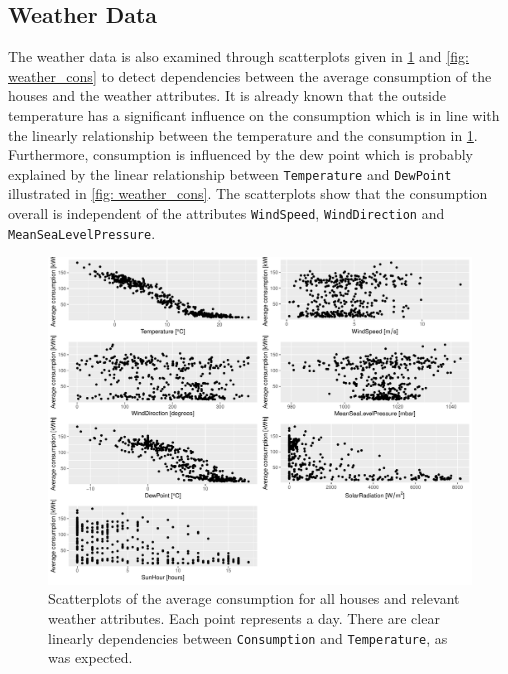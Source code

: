 \subsection{Weather Data}
The weather data is also examined through scatterplots given in \cref{fig: weatherpairs} and \cref{fig: weather_cons} to detect dependencies between the average consumption of the houses and the weather attributes. It is already known that the outside temperature has a significant influence on the consumption which is in line with the linearly relationship between the temperature and the consumption in \cref{fig: weatherpairs}. Furthermore, consumption is influenced by the dew point which is probably explained by the linear relationship between \texttt{Temperature} and \texttt{DewPoint} illustrated in \cref{fig: weather_cons}. The scatterplots show that the consumption overall is independent of the attributes \texttt{WindSpeed}, \texttt{WindDirection} and \texttt{MeanSeaLevelPressure}. 
\begin{figure}[H]
    \centering
    \includegraphics[width=1.\textwidth]{../../../figures/weatherpairs.pdf}
    \caption{Scatterplots of the average consumption for all houses and relevant weather attributes. Each point represents a day. There are clear linearly dependencies between \texttt{Consumption} and \texttt{Temperature}, as was expected.}
    \label{fig: weatherpairs}
\end{figure}


